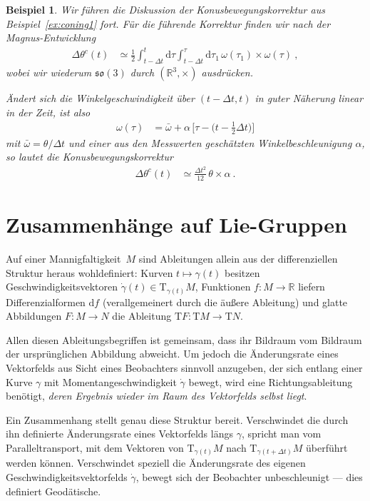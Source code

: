 \documentclass[10pt,a4paper]{article}
\theoremstyle{mytheorem}
\theoremstyle{mydefinition}
\newtheorem{example}[theorem]{Beispiel}
\newcommand{\dt}{\mathrm{d}}
\newcommand{\Tt}{\mathrm{T}}
\newcommand{\fso}{\mathfrak{so}}
\begin{document}
\begin{example}
\label{ex:coning2}
Wir führen die Diskussion der Konusbewegungskorrektur aus Beispiel~\ref{ex:coning1} fort.
Für die führende Korrektur finden wir nach der Magnus-Entwicklung
\begin{align*}
	\Delta\theta^c(t)
	&\simeq
	\frac{1}{2}\int_{t-\Delta t}^t\dt \tau\int_{t-\Delta t}^\tau\dt \tau_1 \,
	\omega(\tau_1)\times\omega(\tau)
	\ ,
\end{align*}
wobei wir wiederum $\fso(3)$ durch $(\mathbb{R}^3,\times)$ ausdrücken.

Ändert sich die Winkelgeschwindigkeit über $(t-\Delta t,t)$ in guter Näherung linear in der Zeit,
ist also
\begin{align*}
	\omega(\tau)
	&=
	\bar{\omega}
	+ \alpha\,
	\big[
		\tau 
		- \big(
			t - \frac{1}{2}\Delta t
		\big)
	\big]
\end{align*}
mit $\bar{\omega}=\theta/\Delta t$ und einer aus den Messwerten geschätzten Winkelbeschleunigung $\alpha$,
so lautet die Konusbewegungskorrektur
\begin{align*}
	\Delta\theta^c(t)
	&\simeq
	\frac{\Delta t^2}{12}\,\theta\times\alpha
	\ .
\end{align*}
\end{example}

\section{Zusammenhänge auf Lie-Gruppen}

Auf einer Mannigfaltigkeit~$M$ sind Ableitungen allein aus der differenziellen Struktur heraus wohldefiniert:
Kurven $t\mapsto\gamma(t)$ besitzen Geschwindigkeitsvektoren $\dot{\gamma}(t)\in\Tt_{\gamma(t)}M$, 
Funktionen $f:M\rightarrow\mathbb{R}$ liefern Differenzialformen $\dt f$ (verallgemeinert durch die äußere Ableitung) 
und glatte Abbildungen $F:M\rightarrow N$ die Ableitung $\Tt F:\Tt M\rightarrow\Tt N$.

Allen diesen Ableitungsbegriffen ist gemeinsam, dass ihr Bildraum vom Bildraum der ursprünglichen Abbildung abweicht.
Um jedoch die Änderungsrate eines Vektorfelds aus Sicht eines Beobachters sinnvoll anzugeben, der sich entlang einer Kurve $\gamma$ mit Momentan\-geschwindigkeit $\dot{\gamma}$ bewegt, wird eine Richtungsableitung benötigt, \emph{deren Ergebnis wieder im Raum des Vektorfelds selbst liegt}.

Ein Zusammenhang stellt genau diese Struktur bereit. 
Verschwindet die durch ihn definierte Änderungsrate eines Vektorfelds längs $\gamma$, spricht man vom Paralleltransport, mit dem Vektoren von $\Tt_{\gamma(t)}M$ nach $\Tt_{\gamma(t+\Delta t)}M$ überführt werden können. Verschwindet speziell die Änderungsrate des eigenen Geschwindigkeitsvektorfelds $\dot{\gamma}$, bewegt sich der Beobachter unbeschleunigt --- dies definiert Geodätische.
\end{document}
